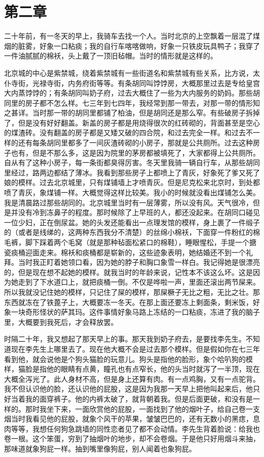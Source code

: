 \section{第二章}

二十年前，有一冬天的早上，我骑车去找一个人。当时北京的上空飘着一层混了煤烟的脏雾，好象一口粘痰；我的自行车喀喀做响，好象一只铁皮玩具鸭子；我穿了一件油腻腻的棉袄，头上戴了一顶旧毡帽。当时的情形就是这样的。 

北京城的中心是紫禁城，绕着紫禁城有一些街道名和紫禁城有些关系，比方说，太仆寺街，光禄寺街，内务府街等等。有条胡同叫饽饽房，大概那里过去是专给皇宫大内蒸饽饽的；有条胡同叫奶子府，过去大概住了一些为大内服务的奶妈。那些胡同里的房子都不怎么样。七三年到七四年，我经常到那一带去，对那一带的情形知之甚详。当时那一带的胡同里都铺了柏油，但是胡同还是那么窄。有些破房子拆掉了，但是没有好好翻盖。新盖的房子都是用烧得很次的红砖砌的，背面甚至是空心的煤渣砖。没有翻盖的房子都是又矮又破的四合院，和过去完全一样。和过去不一样的还有每条胡同里都多了一间灰渣砖砌的小房子，那就是公共厕所。过去这种房子也有，但是不那么多，这是因为院里的茅房都被填死了，大家都得上公共厕所。自从有了这种小房子，每一条街都臭得厉害。冬天里我骑一辆自行车，从那些胡同里经过，路两边都结了薄冰。我看到那些房子上都喷上了青灰，好象死了爹又死了娘的模样。过去北京城里，只有煤铺墙上才喷青灰。但是尼克松来北京时，到处都喷了青灰，象煤铺一样。大概觉得这样比较美。我小的时候就没看出煤铺怎么美。我是清晨路过那些胡同的。北京城里当时有一层薄雾，所以没有风。天气很冷，但是并没有冷到冻鼻子的程度。那时候除了上早班的人，都还没起来。在胡同口碰见一位少妇，正在倒尿盆。她的头发还能看出一点理发馆的模样，身上裹了一件缎子的（或者是线绨的，这两种东西我分不清楚）的丝绵小棉袄，下面穿一件粉红的棉毛裤，脚下踩着两个毛窝（就是那种毡面松紧口的棉鞋），睡眼惺松，手提一个搪瓷痰桶迎面走来。棉袄和痰桶都是崭新的，这些迹象表明，她结婚还不到一个礼拜。当时我正盯着她领口看，因为她的脖子和胸口象雪一样白。我记得她是很漂亮的，但是现在想不起她的模样。就我当时的年龄来说，记性本不该这么坏。这是因为她走到了下水道口上，就把痰桶一倒。不仅是哗啦一声，里面还滚出两节屎来。所以我就没记住她的模样，只记住了屎的模样，那屎橛子无比之粗，无比之壮。那东西就冻在了铁蓖子上，大概要冻一冬天。在那上面还要冻上剩面条，剩米饭，好象一块奇形怪状的萨其玛。这件事情好象马路上冻结的一口粘痰，冻进了我的脑子里，大概要到我死后，才会释放罢。 

时隔二十年，我又想起了那天早上的事。那天我到奶子府去，是要找李先生。不知道现在李先生上哪里去了。现在他大概不会是过去那个模样。但是假如你在七三年看到他，就会说他是个狗头猫脸的玩意儿。狗头是指他的脸形，象个哈叭狗的模样，猫脸是指他的眼睛有点黄，瞳孔也有点窄长，他的头当时就泻了一半顶，现在大概全泻光了。此人身材不高，但是身上还算有肉。有一点鸡胸，又有一点驼背。我不但认识他的脸，还认识他的屁股，这是因为我那一天早上把他叫起来后，他只好当着我的面穿裤子。他的内裤太破了，就背朝着我。但是后面更破，和没有是一样的。那时我坐下来，一面欣赏他的屁股，一面找到了他的烟叶子，给自己卷一支烟当时我看见他的屁股，就象个风干的苹果，皱皱巴巴的，还有无数小的黑痣，息肉等等，我想任何狗急跳墙的同性恋者见了都不会动情。李先生背着脸说：给我也卷一根。这个笨蛋，穷到了抽烟叶的地步，却不会卷烟。于是他只好用烟斗来抽，那味道就象狗屁一样。抽到嘴里像狗屁，别人闻着也象狗屁。 


